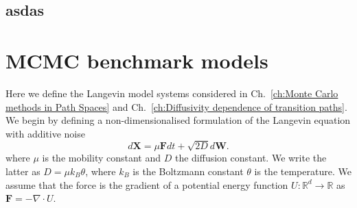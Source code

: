 \documentclass[]{cam-thesis}
\begin{document}
\section{asdas}






%

\renewcommand{\bibname}{References}
\cleardoublepage
{}
{}



%







\cleardoublepage
{}
\appendix
{}



\chapter{MCMC benchmark models} \label{app:MCMC benchmark models}

Here we define the Langevin model systems considered in Ch.~\ref{ch:Monte Carlo methods in Path Spaces} and Ch.~\ref{ch:Diffusivity dependence of transition paths}. We begin by defining a non-dimensionalised formulation of the Langevin equation with additive noise
\begin{equation}
d\mathbf{X}=\mu\mathbf{F}dt+\sqrt{2D}d\mathbf{W}.
\end{equation}
where $\mu$ is the mobility constant and $D$ the diffusion constant. We write the latter as $D = \mu k_B \theta$, where $k_B$ is the Boltzmann constant $\theta$ is the temperature. We assume that the force is the gradient of a potential energy function $U : \mathbb{R}^d \to \mathbb{R}$  as $\mathbf{F} = - \nabla \cdot U$.
\end{document}
